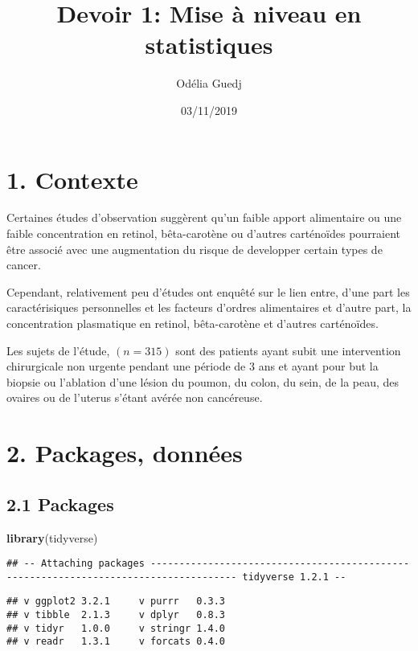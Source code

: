 \documentclass[]{article}
\title{Devoir 1: Mise à niveau en statistiques}
\author{Odélia Guedj}
\date{03/11/2019}
\newenvironment{Shaded}{\begin{snugshade}}{\end{snugshade}}
\newcommand{\KeywordTok}[1]{\textcolor[rgb]{0.13,0.29,0.53}{\textbf{#1}}}
\newcommand{\NormalTok}[1]{#1}
\begin{document}
\maketitle

{
\setcounter{tocdepth}{2}
\tableofcontents
}
\section{1. Contexte}\label{contexte}

Certaines études d'observation suggèrent qu'un faible apport alimentaire
ou une faible concentration en retinol, bêta-carotène ou d'autres
carténoïdes pourraient être associé avec une augmentation du risque de
developper certain types de cancer.

Cependant, relativement peu d'études ont enquêté sur le lien entre,
d'une part les caractérisiques personnelles et les facteurs d'ordres
alimentaires et d'autre part, la concentration plasmatique en retinol,
bêta-carotène et d'autres carténoïdes.

Les sujets de l'étude, \((n = 315)\) sont des patients ayant subit une
intervention chirurgicale non urgente pendant une période de 3 ans et
ayant pour but la biopsie ou l'ablation d'une lésion du poumon, du
colon, du sein, de la peau, des ovaires ou de l'uterus s'étant avérée
non cancéreuse.

\section{2. Packages, données}\label{packages-donnuxe9es}

\subsection{2.1 Packages}\label{packages}

\begin{Shaded}
\begin{Highlighting}[]
\KeywordTok{library}\NormalTok{(tidyverse)}
\end{Highlighting}
\end{Shaded}

\begin{verbatim}
## -- Attaching packages ------------------------------------------------------------------------------------- tidyverse 1.2.1 --
\end{verbatim}

\begin{verbatim}
## v ggplot2 3.2.1     v purrr   0.3.3
## v tibble  2.1.3     v dplyr   0.8.3
## v tidyr   1.0.0     v stringr 1.4.0
## v readr   1.3.1     v forcats 0.4.0
\end{verbatim}
\end{document}
